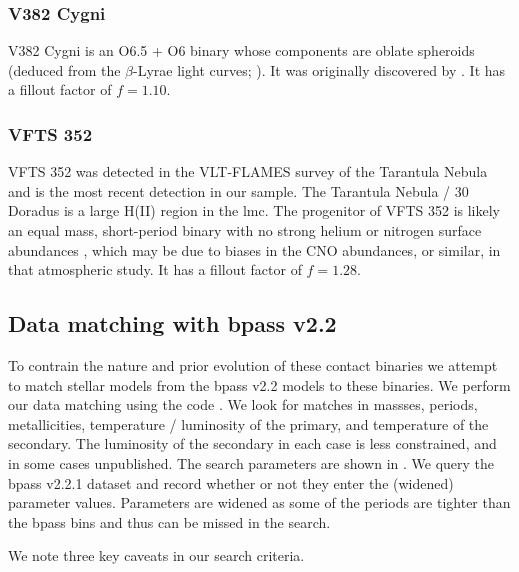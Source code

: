 \subsubsection{V382 Cygni}

V382 Cygni \citep[V382 Cyg;][]{Martins:2017} is an O6.5 + O6 binary whose components are oblate spheroids (deduced from the $\beta$-Lyrae light curves; \citealt{Pearce:1952}). It was originally discovered by \citet{Morgenroth:1935, Petrov:1946}. It has a fillout factor of $f=1.10$.

\subsubsection{VFTS 352}

VFTS 352 was detected in the VLT-FLAMES survey of the Tarantula Nebula \citep{Evans:2011} and is the most recent detection in our sample. The Tarantula Nebula / 30 Doradus is a large H(II) region in the \gls{lmc}. The progenitor of VFTS 352 is likely an equal mass, short-period binary with no strong helium or nitrogen surface abundances \citep{Abdul-masih:2019}, which may be due to biases in the CNO abundances, or similar, in that atmospheric study. It has a fillout factor of $f=1.28$.

\subsection{Data matching with \acrshort{bpass} v2.2}\label{sec:BPASS_data_matching}

To contrain the nature and prior evolution of these contact binaries we attempt to match stellar models from the \gls{bpass} v2.2 models to these binaries. We perform our data matching using the  code \citep{Stevance:2020a}. We look for matches in massses, periods, metallicities, temperature / luminosity of the primary, and temperature of the secondary. The luminosity of the secondary in each case is less constrained, and in some cases unpublished. The search parameters are shown in . We query the \gls{bpass} v2.2.1 dataset and record whether or not they enter the (widened) parameter values. Parameters are widened as some of the periods are tighter than the \gls{bpass} bins and thus can be missed in the search.

We note three key caveats in our search criteria.

